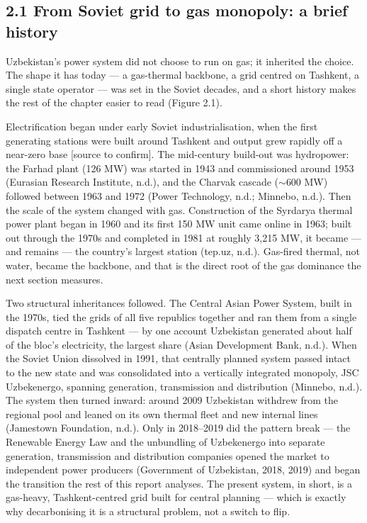 \documentclass[10pt,twocolumn]{article}
\begin{document}
\subsection*{2.1 From Soviet grid to gas monopoly: a brief history}

Uzbekistan's power system did not choose to run on gas; it inherited the choice. The shape it has today --- a gas-thermal backbone, a grid centred on Tashkent, a single state operator --- was set in the Soviet decades, and a short history makes the rest of the chapter easier to read (Figure 2.1).

Electrification began under early Soviet industrialisation, when the first generating stations were built around Tashkent and output grew rapidly off a near-zero base [source to confirm]. The mid-century build-out was hydropower: the Farhad plant (126 MW) was started in 1943 and commissioned around 1953 (Eurasian Research Institute, n.d.), and the Charvak cascade ($\sim$600 MW) followed between 1963 and 1972 (Power Technology, n.d.; Minnebo, n.d.). Then the scale of the system changed with gas. Construction of the Syrdarya thermal power plant began in 1960 and its first 150 MW unit came online in 1963; built out through the 1970s and completed in 1981 at roughly 3,215 MW, it became --- and remains --- the country's largest station (tep.uz, n.d.). Gas-fired thermal, not water, became the backbone, and that is the direct root of the gas dominance the next section measures.

Two structural inheritances followed. The Central Asian Power System, built in the 1970s, tied the grids of all five republics together and ran them from a single dispatch centre in Tashkent --- by one account Uzbekistan generated about half of the bloc's electricity, the largest share (Asian Development Bank, n.d.). When the Soviet Union dissolved in 1991, that centrally planned system passed intact to the new state and was consolidated into a vertically integrated monopoly, JSC Uzbekenergo, spanning generation, transmission and distribution (Minnebo, n.d.). The system then turned inward: around 2009 Uzbekistan withdrew from the regional pool and leaned on its own thermal fleet and new internal lines (Jamestown Foundation, n.d.). Only in 2018--2019 did the pattern break --- the Renewable Energy Law and the unbundling of Uzbekenergo into separate generation, transmission and distribution companies opened the market to independent power producers (Government of Uzbekistan, 2018, 2019) and began the transition the rest of this report analyses. The present system, in short, is a gas-heavy, Tashkent-centred grid built for central planning --- which is exactly why decarbonising it is a structural problem, not a switch to flip.
\end{document}
